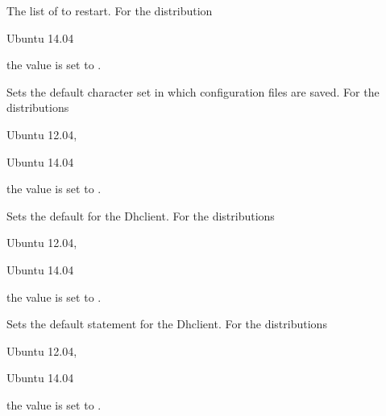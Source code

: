 
The list of  to restart.
For the distribution
\begin{inparaitem}
\item[\TheDistribution{ubuntu}] Ubuntu 14.04
\end{inparaitem}
the value is set to .


Sets the default character set  in which configuration files are 
saved. For the distributions
\begin{inparaitem}
\item[\TheDistribution{ubuntu}] Ubuntu 12.04,
\item[\TheDistribution{ubuntu}] Ubuntu 14.04
\end{inparaitem}
the value is set to .


Sets the default  for the Dhclient. For the distributions
\begin{inparaitem}
\item[\TheDistribution{ubuntu}] Ubuntu 12.04,
\item[\TheDistribution{ubuntu}] Ubuntu 14.04
\end{inparaitem}
the value is set to .


Sets the default  statement for the Dhclient. For the distributions
\begin{inparaitem}
\item[\TheDistribution{ubuntu}] Ubuntu 12.04,
\item[\TheDistribution{ubuntu}] Ubuntu 14.04
\end{inparaitem}
the value is set to .



